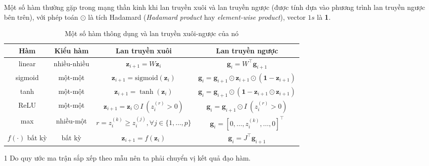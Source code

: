 Một số hàm thường gặp trong mạng thần kinh khi lan truyền xuôi và lan truyền ngược (được tính dựa vào phương trình lan truyền ngược bên trên), với phép toán $\odot$ là tích Hadamard (\textit{Hadamard product} hay \textit{element-wise product}), vector $1s$ là \textbf 1.
\begin{table}[htbp]
    \centering
    \caption[Một số hàm thông dụng và lan truyền xuôi-ngược của nó]{Một số hàm thông dụng và lan truyền xuôi-ngược của nó \cite{Aggarwal2023}}
    \label{table:derivative-forward-backward}
    \begin{threeparttable}
        \begin{tabularx}{\textwidth}{ c c C{1} C{1} }
            \toprule
            \textbf{Hàm}      & \textbf{Kiểu hàm} & \textbf{Lan truyền xuôi}                              & \textbf{Lan truyền ngược}                                                           \\\midrule
            linear            & nhiều-nhiều       & $\mathbf z_{i+1}=W\mathbf z_i$                        & $\mathbf g_i=W^\intercal\mathbf g_{i+1}$                                   \\\midrule
            sigmoid           & một-một           & $\mathbf z_{i+1}=\text{sigmoid}(\mathbf z_i)$         & $\mathbf g_i=\mathbf g_{i+1}\odot\mathbf z_{i+1}\odot(\mathbf 1-\mathbf z_{i+1})$   \\\midrule
            tanh              & một-một           & $\mathbf z_{i+1}=\tanh(\mathbf z_i)$                  & $\mathbf g_i=\mathbf g_{i+1}\odot(\mathbf 1 - \mathbf z_{i+1}\odot\mathbf z_{i+1})$ \\\midrule
            ReLU              & một-một           & $\mathbf z_{i+1}=\mathbf z_i\odot I\ (z_i^{(r)}>0)$   & $\mathbf g_i=\mathbf g_{i+1}\odot I\ (z_i^{(r)}>0)$                                 \\\midrule
            max               & nhiều-một         & $r=z_i^{(k)}\geq z_i^{(j)},\forall j\in\{1,\dots,p\}$ & $\mathbf g_i=[0,\dots,z_i^{(k)},\dots,0]^\intercal$                        \\\midrule
            $f(\cdot)$ bất kỳ & bất kỳ            & $\mathbf z_{i+1}=f(\mathbf z_i)$                      & $\mathbf g_i=J^\intercal\mathbf g_{i+1}$                                   \\
            \bottomrule
        \end{tabularx}
        \begin{tablenotes}
            \item[1] Do quy ước ma trận sắp xếp theo mẫu nên ta phải chuyển vị kết quả đạo hàm.

\end{tablenotes}
\end{threeparttable}
\end{table}
